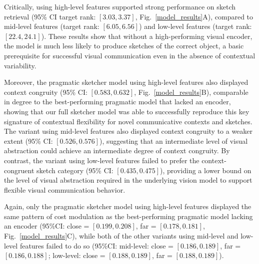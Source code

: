 \documentclass[9pt,twocolumn,twoside]{pnas-new}
\begin{document}
Critically, using high-level features supported strong performance on sketch retrieval (95\% CI target rank: $[3.03, 3.37]$, Fig.~\ref{model_results}A), compared to mid-level features (target rank: $[6.05, 6.56]$) and low-level features (target rank: $[22.4, 24.1]$). 
These results show that without a high-performing visual encoder, the model is much less likely to produce sketches of the correct object, a basic prerequisite for successful visual communication even in the absence of contextual variability. 

Moreover, the pragmatic sketcher model using high-level features also displayed context congruity (95\% CI: $[0.583, 0.632]$, Fig.~\ref{model_results}B), comparable in degree to the best-performing pragmatic model that lacked an encoder, showing that our full sketcher model was able to successfully reproduce this key signature of contextual flexibility for novel communicative contexts and sketches. 
The variant using mid-level features also displayed context congruity to a weaker extent (95\% CI: $[0.526, 0.576]$), suggesting that an intermediate level of visual abstraction could achieve an intermediate degree of context congruity. 
By contrast, the variant using low-level features failed to prefer the context-congruent sketch category (95\% CI: $[0.435, 0.475]$), providing a lower bound on the level of visual abstraction required in the underlying vision model to support flexible visual communication behavior. 

Again, only the pragmatic sketcher model using high-level features displayed the same pattern of cost modulation as the best-performing pragmatic model lacking an encoder (95\%CI: close = $[0.199, 0.208]$, far = $[0.178, 0.181]$, Fig.~\ref{model_results}C), while both of the other variants using mid-level and low-level features failed to do so (95\%CI: mid-level: close = $[0.186, 0.189]$, far = $[0.186, 0.188]$; low-level: close = $[0.188, 0.189]$, far = $[0.188, 0.189]$).  
\end{document}
